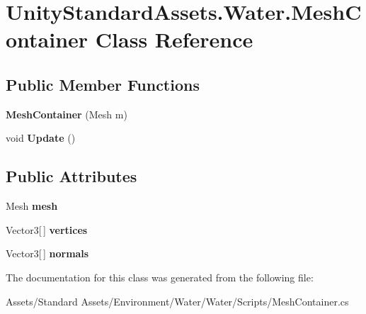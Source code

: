 \hypertarget{class_unity_standard_assets_1_1_water_1_1_mesh_container}{}\section{Unity\+Standard\+Assets.\+Water.\+Mesh\+Container Class Reference}
\label{class_unity_standard_assets_1_1_water_1_1_mesh_container}
\subsection*{Public Member Functions}
\begin{DoxyCompactItemize}
\item 
{\bfseries Mesh\+Container} (Mesh m)\hypertarget{class_unity_standard_assets_1_1_water_1_1_mesh_container_ab3954cf99b38ff6e490b3fdd5f70e8d3}{}\label{class_unity_standard_assets_1_1_water_1_1_mesh_container_ab3954cf99b38ff6e490b3fdd5f70e8d3}

\item 
void {\bfseries Update} ()\hypertarget{class_unity_standard_assets_1_1_water_1_1_mesh_container_a7d085fdd2ba5e0f4372715ac24ab9600}{}\label{class_unity_standard_assets_1_1_water_1_1_mesh_container_a7d085fdd2ba5e0f4372715ac24ab9600}

\end{DoxyCompactItemize}
\subsection*{Public Attributes}
\begin{DoxyCompactItemize}
\item 
Mesh {\bfseries mesh}\hypertarget{class_unity_standard_assets_1_1_water_1_1_mesh_container_a58588088068a9018408b031d1cd49ba6}{}\label{class_unity_standard_assets_1_1_water_1_1_mesh_container_a58588088068a9018408b031d1cd49ba6}

\item 
Vector3\mbox{[}$\,$\mbox{]} {\bfseries vertices}\hypertarget{class_unity_standard_assets_1_1_water_1_1_mesh_container_ab5e8bdf3abb08789b1aff3ee38f1922d}{}\label{class_unity_standard_assets_1_1_water_1_1_mesh_container_ab5e8bdf3abb08789b1aff3ee38f1922d}

\item 
Vector3\mbox{[}$\,$\mbox{]} {\bfseries normals}\hypertarget{class_unity_standard_assets_1_1_water_1_1_mesh_container_a954d32b18a55d83289fa567d17f28bdc}{}\label{class_unity_standard_assets_1_1_water_1_1_mesh_container_a954d32b18a55d83289fa567d17f28bdc}

\end{DoxyCompactItemize}


The documentation for this class was generated from the following file\+:\begin{DoxyCompactItemize}
\item 
Assets/\+Standard Assets/\+Environment/\+Water/\+Water/\+Scripts/Mesh\+Container.\+cs\end{DoxyCompactItemize}
